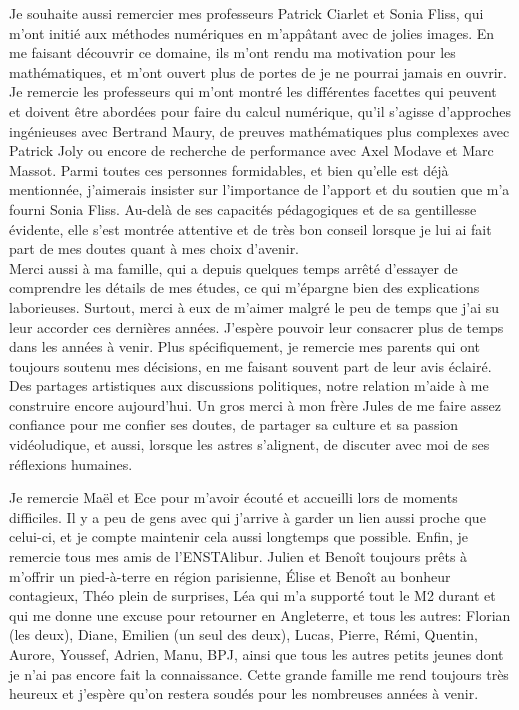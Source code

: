 \documentclass{templatePFE}
\begin{document}
Je souhaite aussi remercier mes professeurs Patrick Ciarlet et Sonia Fliss, qui m'ont initié aux méthodes numériques en m'appâtant avec de jolies images. 
En me faisant découvrir ce domaine, ils m'ont rendu ma motivation pour les mathématiques, et m'ont ouvert plus de portes de je ne pourrai jamais en ouvrir. 
Je remercie les professeurs qui m'ont montré les différentes facettes qui peuvent et doivent être abordées pour faire du calcul numérique, qu'il s'agisse d'approches ingénieuses avec Bertrand Maury, de preuves mathématiques plus complexes avec Patrick Joly ou encore de recherche de performance avec Axel Modave et Marc Massot. 
Parmi toutes ces personnes formidables, et bien qu'elle est déjà mentionnée, j'aimerais insister sur l'importance de l'apport et du soutien que m'a fourni Sonia Fliss. 
Au-delà de ses capacités pédagogiques et de sa gentillesse évidente, elle s'est montrée attentive et de très bon conseil lorsque je lui ai fait part de mes doutes quant à mes choix d'avenir. 
\\ 

Merci aussi à ma famille, qui a depuis quelques temps arrêté d'essayer de comprendre les détails de mes études, ce qui m'épargne bien des explications laborieuses. 
Surtout, merci à eux de m'aimer malgré le peu de temps que j'ai su leur accorder ces dernières années. 
J'espère pouvoir leur consacrer plus de temps dans les années à venir. 
Plus spécifiquement, je remercie mes parents qui ont toujours soutenu mes décisions, en me faisant souvent part de leur avis éclairé. 
Des partages artistiques aux discussions politiques, notre relation m'aide à me construire encore aujourd'hui. 
Un gros merci à mon frère Jules de me faire assez confiance pour me confier ses doutes, de partager sa culture et sa passion vidéoludique, et aussi, lorsque les astres s'alignent, de discuter avec moi de ses réflexions humaines. 

Je remercie Maël et Ece pour m'avoir écouté et accueilli lors de moments difficiles. 
Il y a peu de gens avec qui j'arrive à garder un lien aussi proche que celui-ci, et je compte maintenir cela aussi longtemps que possible. 
Enfin, je remercie tous mes amis de l'ENSTAlibur. Julien et Benoît toujours prêts à m'offrir un pied-à-terre en région parisienne, Élise et Benoît au bonheur contagieux, Théo plein de surprises, Léa qui m'a supporté tout le M2 durant et qui me donne une excuse pour retourner en Angleterre, et tous les autres: 
Florian (les deux), Diane, Emilien (un seul des deux), Lucas, Pierre, Rémi, Quentin, Aurore, Youssef, Adrien, Manu, BPJ, ainsi que tous les autres petits jeunes dont je n'ai pas encore fait la connaissance. 
Cette grande famille me rend toujours très heureux et j'espère qu'on restera soudés pour les nombreuses années à venir. 
\end{document}
